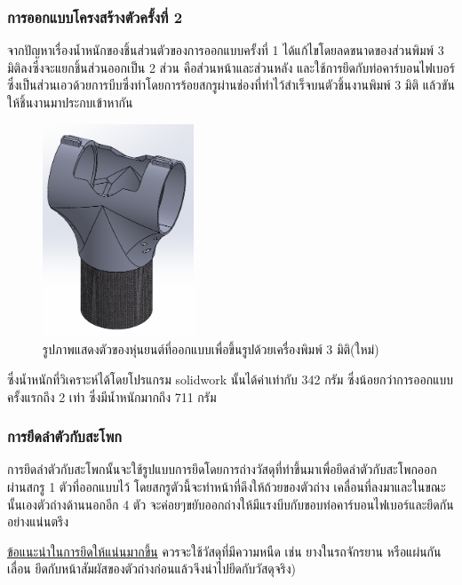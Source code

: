 \subsubsection{การออกแบบโครงสร้างตัวครั้งที่ 2}
จากปัญหาเรื่องน้ำหนักของชิ้นส่วนตัวของการออกแบบครั้งที่ 1 ได้แก้ไขโดยลดขนาดของส่วนพิมพ์ 3 มิติลงซึ่งจะแยกชิ้นส่วนออกเป็น 2 ส่วน คือส่วนหน้าและส่วนหลัง
และใช้การยึดกับท่อคาร์บอนไฟเบอร์ซึ่งเป็นส่วนเอวด้วยการบีบซึ่งทำโดยการร้อยสกรูผ่านช่องที่ทำไว้สำเร็จบนตัวชิ้นงานพิมพ์ 3 มิติ แล้วขันให้ชิ้นงานมาประกบเข้าหากัน
\begin{figure}[!ht]
  \centering
  \includegraphics[width=0.4\textwidth]{chapter4/images/troso_new.PNG}
  \caption{รูปภาพแสดงตัวของหุ่นยนต์ที่ออกแบบเพื่อขึ้นรูปด้วยเครื่องพิมพ์ 3 มิติ(ใหม่)}
  \label{fig:torso_new}
\end{figure}
ซึ่งน้ำหนักที่วิเคราะห์ได้โดยโปรแกรม solidwork นั้นได้ค่าเท่ากับ 342 กรัม ซึ่งน้อยกว่าการออกแบบครั้งแรกถึง 2 เท่า ซึ่งมีน้ำหนักมากถึง 711 กรัม

\subsubsection*{การยึดลำตัวกับสะโพก}
การยึดลำตัวกับสะโพกนั้นจะใช้รูปแบบการยึดโดยการถ่างวัสดุที่ทำขึ้นมาเพื่อยึดลำตัวกับสะโพกออกผ่านสกรู 1 ตัวที่ออกแบบไว้ โดยสกรูตัวนี้จะทำหน้าที่ดึงให้ถ้วยของตัวถ่าง
เคลื่อนที่ลงมาและในขณะนั้นเองตัวถ่างด้านนอกอีก 4 ตัว จะค่อยๆขยับออกถ่างให้มีแรงบีบกับขอบท่อคาร์บอนไฟเบอร์และยึดกันอย่างแน่นตรึง

\underline{ข้อแนะนำในการยึดให้แน่นมากขึ้น}
ควรจะใช้วัสดุที่มีความหนืด เช่น ยางในรถจักรยาน หรือแผ่นกันเลื่อน ยึดกับหน้าสัมผัสของตัวถ่างก่อนแล้วจึงนำไปยึดกับวัสดุจริง)

